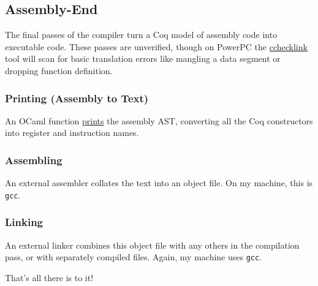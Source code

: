 \newpage
\subsection{Assembly-End}
The final passes of the compiler turn a Coq model of assembly code into executable code.
These passes are unverified, though on PowerPC the \href{https://github.com/robbertkrebbers/compcert/blob/master/checklink/Check.ml#L3140}{cchecklink} tool will scan for basic translation errors like mangling a data segment or dropping function definition.


\subsubsection{Printing (Assembly to Text)}
An OCaml function \href{https://github.com/AbsInt/CompCert/blob/master/ia32/TargetPrinter.ml}{prints} the assembly AST, converting all the Coq constructors into register and instruction names.


\subsubsection{Assembling}
An external assembler collates the text into an object file.
On my machine, this is {\tt gcc}.


\subsubsection{Linking}
An external linker combines this object file with any others in the compilation pass, or with separately compiled files.
Again, my machine uses {\tt gcc}.

That's all there is to it!
